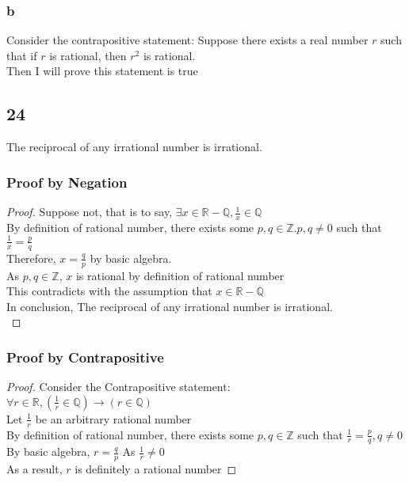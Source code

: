 \documentclass{article}
\begin{document}
\subsubsection{b}
Consider the contrapositive statement: Suppose there exists a real number $r$ such that if $r$ is rational, then $r^2$ is rational.\\
Then I will prove this statement is true
\subsection{24}
The reciprocal of any irrational number is irrational.\\
\subsubsection{Proof by Negation}
\begin{proof}
Suppose not, that is to say, $\exists x \in \mathbb{R} - \mathbb{Q}, \frac{1}{x} \in \mathbb{Q}$\\
By definition of rational number, there exists some $p,q \in \mathbb{Z}. p,q \neq 0$ such that $\frac{1}{x} = \frac{p}{q}$\\
Therefore, $x = \frac{q}{p}$ by basic algebra.\\
As $p,q \in \mathbb{Z}$, $x$ is rational by definition of rational number\\
This contradicts with the assumption that $x \in \mathbb{R} - \mathbb{Q}$\\
In conclusion, The reciprocal of any irrational number is irrational.\\
\end{proof}


\subsubsection{Proof by Contrapositive}
\begin{proof}
Consider the Contrapositive statement:\\
$\forall r \in \mathbb{R},(\frac{1}{r} \in \mathbb{Q}) \rightarrow (r \in \mathbb{Q})$    \\
Let $\frac{1}{r}$ be an arbitrary rational number\\
By definition of rational number, there exists some $p,q \in \mathbb{Z}$ such that $\frac{1}{r} = \frac{p}{q}, q \neq 0$\\
By basic algebra, $r = \frac{q}{p}$ As $\frac{1}{r} \neq 0$\\
As a result, $r$ is definitely a rational number
\end{proof}
\end{document}
